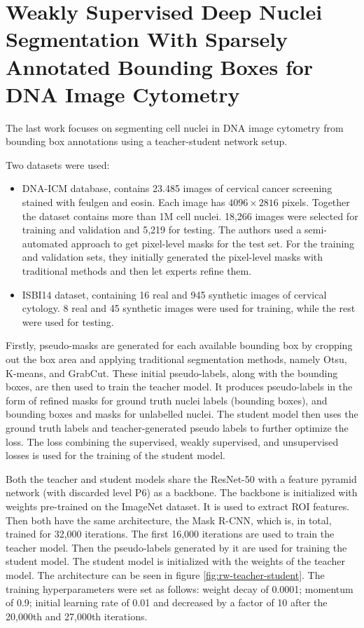 \section{Weakly Supervised Deep Nuclei Segmentation With Sparsely Annotated Bounding Boxes for DNA Image Cytometry \cite{Liang2023}}
The last work focuses on segmenting cell nuclei in DNA image cytometry from bounding box annotations using a teacher-student network setup.

Two datasets were used:

\begin{itemize}
    \item DNA-ICM database, contains 23.485 images of cervical cancer screening stained with feulgen and eosin. Each image has $4096\!\times\!2816$ pixels. Together the dataset contains more than 1M cell nuclei. 18,266 images were selected for training and validation and 5,219 for testing. The authors used a semi-automated approach to get pixel-level masks for the test set. For the training and validation sets, they initially generated the pixel-level masks with traditional methods and then let experts refine them.
    \item ISBI14 dataset, containing 16 real and 945 synthetic images of cervical cytology. 8 real and 45 synthetic images were used for training, while the rest were used for testing.
\end{itemize}

Firstly, pseudo-masks are generated for each available bounding box by cropping out the box area and applying traditional segmentation methods, namely Otsu, K-means, and GrabCut. These initial pseudo-labels, along with the bounding boxes, are then used to train the teacher model. It produces pseudo-labels in the form of refined masks for ground truth nuclei labels (bounding boxes), and bounding boxes and masks for unlabelled nuclei. The student model then uses the ground truth labels and teacher-generated pseudo labels to further optimize the loss. The loss combining the supervised, weakly supervised, and unsupervised losses is used for the training of the student model.

Both the teacher and student models share the ResNet-50 with a feature pyramid network (with discarded level P6) as a backbone. The backbone is initialized with weights pre-trained on the ImageNet dataset. It is used to extract ROI features. Then both have the same architecture, the Mask R-CNN, which is, in total, trained for 32,000 iterations. The first 16,000 iterations are used to train the teacher model. Then the pseudo-labels generated by it are used for training the student model. The student model is initialized with the weights of the teacher model. The architecture can be seen in figure \ref{fig:rw-teacher-student}. The training hyperparameters were set as follows: weight decay of 0.0001; momentum of 0.9; initial learning rate of 0.01 and decreased by a factor of 10 after the 20,000th and 27,000th iterations.

